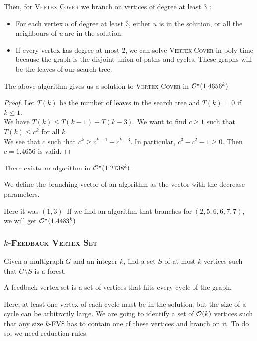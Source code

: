 \documentclass[12pt]{cours}
\begin{document}
Then, for \textsc{Vertex Cover} we branch on vertices of degree at least $3$ :
\begin{itemize}
    \item For each vertex $u$ of degree at least $3$, either $u$ is in the solution, or all the neighbours of $u$ are in the solution.
    \item If every vertex has degree at most $2$, we can solve \textsc{Vertex Cover} in poly-time because the graph is the disjoint union of paths and cycles. These graphs will be the leaves of our search-tree.
\end{itemize}


\begin{proposition}
    The above algorithm gives us a solution to \textsc{Vertex Cover} in $\mathcal{O}^{\star}(1.4656^{k})$
\end{proposition}
\begin{proof}
    Let $T(k)$ be the number of leaves in the search tree and $T(k) = 0$ if $k \leq 1$. \\
    We have $T(k) \leq T(k - 1) + T(k - 3)$. We want to find $c \geq 1$ such that $T(k) \leq c^{k}$ for all $k$. \\
    We see that $c$ such that $c^{k} \geq c^{k - 1} + c^{k - 3}$. In particular, $c^{3} - c^{2} - 1 \geq 0$. Then $c = 1.4656$ is valid.
\end{proof}
\begin{remark}
    There exists an algorithm in $\mathcal{O}^{\star}(1.2738^{k})$.
\end{remark}

\begin{definition}
    We define the branching vector of an algorithm as the vector with the decrease parameters.
\end{definition}
Here it was $(1, 3)$. If we find an algorithm that branches for $(2, 5, 6, 6, 7, 7)$, we will get $\mathcal{O}^{\star}(1.4483^{k})$

\subsubsection{$k$-\textsc{Feedback Vertex Set}}
\begin{definition}
    Given a multigraph $G$ and an integer $k$, find a set $S$ of at most $k$ vertices such that $G \setminus S$ is a forest.
\end{definition}
A feedback vertex set is a set of vertices that hits every cycle of the graph.

Here, at least one vertex of each cycle must be in the solution, but the size of a cycle can be arbitrarily large. We are going to identify a set of $\mathcal{O}(k)$ vertices such that any size $k$-FVS has to contain one of these vertices and branch on it. To do so, we need reduction rules.
\end{document}

